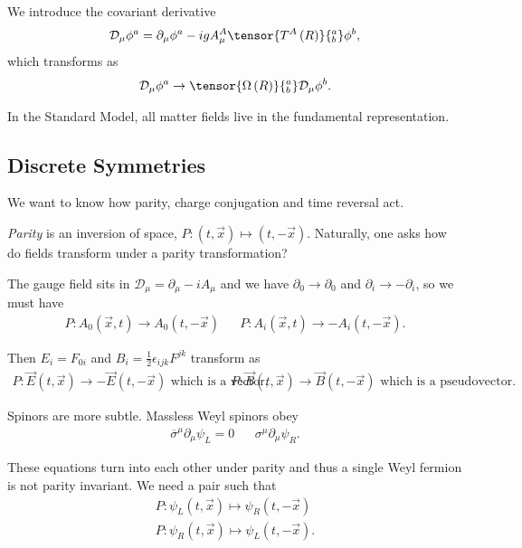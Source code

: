 We introduce the covariant derivative
\begin{align}
    \mathcal{D}_\mu \phi^{a} = \partial_\mu \phi^{a} - ig A_\mu^{A} \tensor{T^{A}\left( R \right)}{^{a}_b} \phi^{b}
,\end{align}
which transforms as
\begin{align}
    \mathcal{D}_\mu \phi^{a} \to \tensor{\Omega \left( R \right)}{^{a}_b} \mathcal{D}_\mu \phi^{b}
.\end{align}

In the Standard Model, all matter fields live in the fundamental representation.


\subsection{Discrete Symmetries}

We want to know how parity, charge conjugation and time reversal act.

\emph{Parity} is an inversion of space, $P : \left( t, \vec{x} \right) \mapsto \left( t, -\vec{x} \right)$. Naturally, one asks how do fields transform under a parity transformation? 

The gauge field sits in $\mathcal{D}_\mu = \partial_\mu - i A_\mu$ and we have $\partial_0 \to \partial_0$ and $\partial_i \to - \partial_i$, so we must have
\begin{align}
    P: A_0 \left( \vec{x},t \right) \to A_0 \left( t,-\vec{x} \right)  &&
    P : A_i \left( \vec{x},t \right) \to - A_i \left( t,-\vec{x} \right) 
.\end{align}

Then $E_i = F_{0i}$ and $B_i = \frac{1}{2} \epsilon_{ijk} F^{jk}$ transform as
\begin{align}
    P : \vec{E} \left( t,\vec{x} \right) \to - \vec{E}\left( t,-\vec{x} \right) \text{~which is a vector,} &&
    P : \vec{B} \left( t,\vec{x} \right) \to \vec{B}\left( t,-\vec{x} \right) \text{~which is a pseudovector}
.\end{align}

Spinors are more subtle. Massless Weyl spinors obey
\begin{align}
    \overline{\sigma}^{\mu}\partial_\mu \psi_L = 0 && \sigma^{\mu} \partial_\mu \psi_R
.\end{align}

These equations turn into each other under parity and thus a single Weyl fermion is not parity invariant. We need a pair such that
\begin{align}
    P : \psi_L \left( t,\vec{x} \right) \mapsto \psi_R \left( t, -\vec{x} \right)  \\
    P : \psi_R \left( t,\vec{x} \right) \mapsto \psi_L \left( t, -\vec{x} \right) 
.\end{align}

